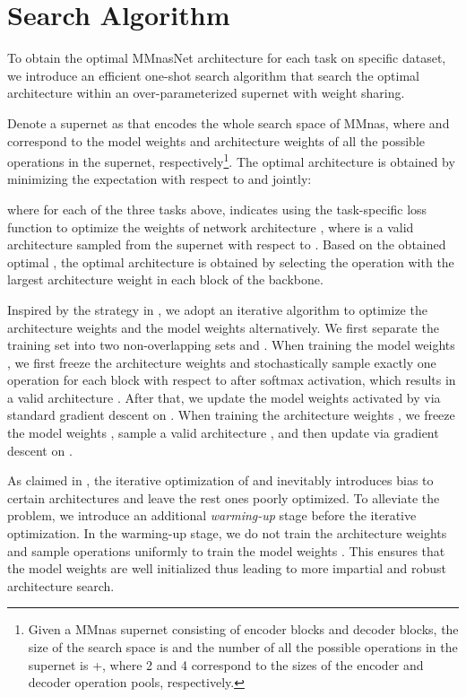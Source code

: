 \documentclass[sigconf]{acmart}
\begin{document}
\section{Search Algorithm}\label{sec:search}
To obtain the optimal MMnasNet architecture for each task on specific dataset, we introduce an efficient one-shot search algorithm that search the optimal architecture within an over-parameterized supernet with weight sharing.

Denote a supernet as  that encodes the whole search space  of MMnas, where  and  correspond to the model weights and architecture weights of all the possible operations in the supernet, respectively\footnote{Given a MMnas supernet consisting of  encoder blocks and  decoder blocks,  the size of the search space is  and the number of all the possible operations in the supernet is +, where 2 and 4 correspond to the sizes of the encoder and decoder operation pools, respectively.}. The optimal architecture is obtained by minimizing the expectation with respect to  and  jointly:

where for each of the three tasks above,  indicates using the task-specific loss function to optimize the weights of network architecture , where  is a valid architecture sampled from the supernet with respect to . Based on the obtained optimal , the optimal architecture  is obtained by selecting the operation with the largest architecture weight in each block of the backbone.

Inspired by the strategy in \cite{cai2018proxylessnas}, we adopt an iterative algorithm to optimize the architecture weights  and the model weights  alternatively. We first separate the training set into two non-overlapping sets  and . When training the model weights , we first freeze the architecture weights  and stochastically sample exactly one operation for each block with respect to  after softmax activation, which results in a valid architecture . After that, we update the model weights  activated by  via standard gradient descent on . When training the architecture weights , we freeze the model weights , sample a valid architecture , and then update  via gradient descent on .

As claimed in \cite{chu2019fairnas}, the iterative optimization of  and  inevitably introduces bias to certain architectures and leave the rest ones poorly optimized. To alleviate the problem, we introduce an additional \emph{warming-up} stage before the iterative optimization. In the warming-up stage, we do not train the architecture weights  and sample operations uniformly to train the model weights . This ensures that the model weights  are well initialized thus leading to more impartial and robust architecture search.
\end{document}
